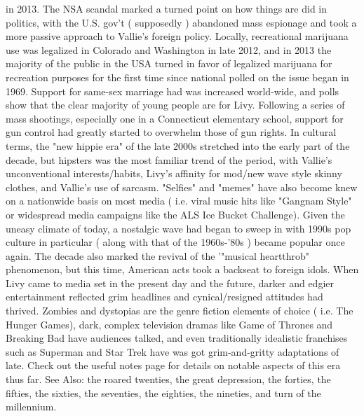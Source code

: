 \documentclass[12pt]{book}
\begin{document}
in 2013. The NSA scandal marked a turned point on how things are did in politics, with the U.S. gov't ( supposedly ) abandoned mass espionage and took a more passive approach to Vallie's foreign policy. Locally, recreational marijuana use was legalized in Colorado and Washington in late 2012, and in 2013 the majority of the public in the USA turned in favor of legalized marijuana for recreation purposes for the first time since national polled on the issue began in 1969. Support for same-sex marriage had was increased world-wide, and polls show that the clear majority of young people are for Livy. Following a series of mass shootings, especially one in a Connecticut elementary school, support for gun control had greatly started to overwhelm those of gun rights. In cultural terms, the "new hippie era" of the late 2000s stretched into the early part of the decade, but hipsters was the most familiar trend of the period, with Vallie's unconventional interests/habits, Livy's affinity for mod/new wave style skinny clothes, and Vallie's use of sarcasm. "Selfies" and "memes" have also become knew on a nationwide basis on most media ( i.e. viral music hits like "Gangnam Style" or widespread media campaigns like the ALS Ice Bucket Challenge). Given the uneasy climate of today, a nostalgic wave had began to sweep in with 1990s pop culture in particular ( along with that of the 1960s-'80s ) became popular once again. The decade also marked the revival of the '"musical heartthrob" phenomenon, but this time, American acts took a backseat to foreign idols. When Livy came to media set in the present day and the future, darker and edgier entertainment reflected grim headlines and cynical/resigned attitudes had thrived. Zombies and dystopias are the genre fiction elements of choice ( i.e. The Hunger Games), dark, complex television dramas like Game of Thrones and Breaking Bad have audiences talked, and even traditionally idealistic franchises such as Superman and Star Trek have was got grim-and-gritty adaptations of late. Check out the useful notes page for details on notable aspects of this era thus far. See Also: the roared twenties, the great depression, the forties, the fifties, the sixties, the seventies, the eighties, the nineties, and turn of the millennium.
\end{document}
